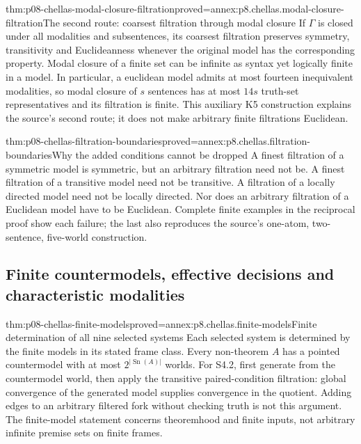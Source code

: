 \begin{hbtheorem}{thm:p08-chellas-modal-closure-filtration}{proved=annex:p8.chellas.modal-closure-filtration}{The second route: coarsest filtration through modal closure}
If \(\Gamma\) is closed under all modalities and subsentences, its
coarsest filtration preserves symmetry, transitivity and Euclideanness
whenever the original model has the corresponding property.
Modal closure of a finite set can be infinite as syntax yet logically
finite in a model. In particular, a euclidean model admits at most
fourteen inequivalent modalities, so modal closure of \(s\) sentences
has at most \(14s\) truth-set representatives and its filtration is
finite. This auxiliary K5 construction explains the source's second
route; it does not make arbitrary finite filtrations Euclidean.
\end{hbtheorem}

\begin{hbtheorem}{thm:p08-chellas-filtration-boundaries}{proved=annex:p8.chellas.filtration-boundaries}{Why the added conditions cannot be dropped}
A finest filtration of a symmetric model is symmetric, but an arbitrary
filtration need not be. A finest filtration of a transitive model need
not be transitive. A filtration of a locally directed model need not
be locally directed. Nor does an arbitrary filtration of a Euclidean
model have to be Euclidean. Complete finite examples in the reciprocal
proof show each failure; the last also reproduces the source's
one-atom, two-sentence, five-world construction.
\end{hbtheorem}

\subsection{Finite countermodels, effective decisions and characteristic modalities}

\begin{hbtheorem}{thm:p08-chellas-finite-models}{proved=annex:p8.chellas.finite-models}{Finite determination of all nine selected systems}
Each selected system is determined by the finite models in its stated
frame class. Every non-theorem \(A\) has a pointed countermodel
with at most \(2^{|\operatorname{Sn}(A)|}\) worlds.
For S4.2, first generate from the countermodel world, then apply
the transitive paired-condition filtration: global convergence of the
generated model supplies convergence in the quotient. Adding edges to
an arbitrary filtered fork without checking truth is not this argument.
The finite-model statement concerns theoremhood and finite inputs, not
arbitrary infinite premise sets on finite frames.
\end{hbtheorem}

